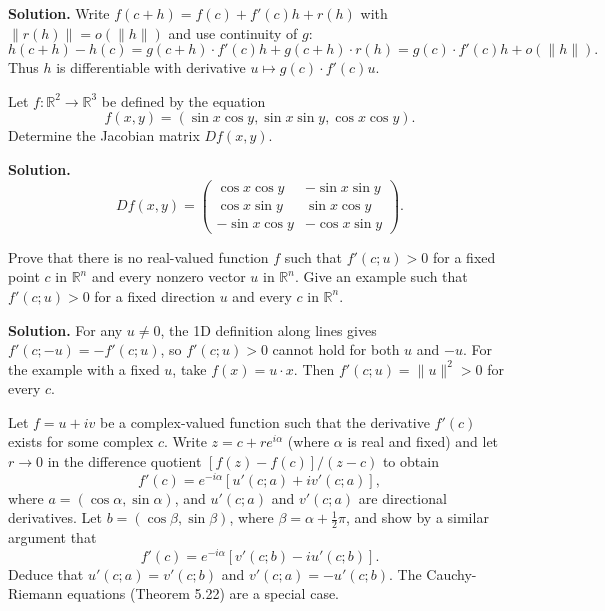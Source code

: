 \noindent\textbf{Solution.}
Write $f(c+h)=f(c)+f'(c)h+r(h)$ with $\|r(h)\|=o(\|h\|)$ and use continuity of $g$:
\[h(c+h)-h(c)=g(c+h)\cdot f'(c)h+g(c+h)\cdot r(h)=g(c)\cdot f'(c)h+o(\|h\|).\]
Thus $h$ is differentiable with derivative $u\mapsto g(c)\cdot f'(c)u$.

\begin{problembox}
Let \( f : \mathbb{R}^2 \to \mathbb{R}^3 \) be defined by the equation
\[f(x, y) = (\sin x \cos y, \sin x \sin y, \cos x \cos y).\]
Determine the Jacobian matrix \( Df(x, y) \).
\end{problembox}

\noindent\textbf{Solution.}
\[Df(x,y)=\begin{pmatrix}
\cos x\cos y & -\sin x\sin y\\
\cos x\sin y & \sin x\cos y\\
-\sin x\cos y & -\cos x\sin y
\end{pmatrix}.\]


\begin{problembox}
Prove that there is no real-valued function \( f \) such that \( f'(c; u) > 0 \) for a fixed point \( c \) in \( \mathbb{R}^n \) and every nonzero vector \( u \) in \( \mathbb{R}^n \). Give an example such that \( f'(c; u) > 0 \) for a fixed direction \( u \) and every \( c \) in \( \mathbb{R}^n \).
\end{problembox}

\noindent\textbf{Solution.}
For any $u\ne0$, the 1D definition along lines gives $f'(c;-u)=-f'(c;u)$, so $f'(c;u)>0$ cannot hold for both $u$ and $-u$. For the example with a fixed $u$, take $f(x)=u\cdot x$. Then $f'(c;u)=\|u\|^2>0$ for every $c$.

\begin{problembox}
Let \( f = u + iv \) be a complex-valued function such that the derivative \( f'(c) \) exists for some complex \( c \). Write \( z = c + re^{i\alpha} \) (where \( \alpha \) is real and fixed) and let \( r \to 0 \) in the difference quotient \( [f(z) - f(c)]/(z - c) \) to obtain
\[f'(c) = e^{-i\alpha}[u'(c; a) + iv'(c; a)],\]
where \( a = (\cos \alpha, \sin \alpha) \), and \( u'(c; a) \) and \( v'(c; a) \) are directional derivatives. Let \( b = (\cos \beta, \sin \beta) \), where \( \beta = \alpha + \frac{1}{2}\pi \), and show by a similar argument that
\[f'(c) = e^{-i\alpha}[v'(c; b) - iu'(c; b)].\]
Deduce that \( u'(c; a) = v'(c; b) \) and \( v'(c; a) = -u'(c; b) \). The Cauchy-Riemann equations (Theorem 5.22) are a special case.
\end{problembox}

